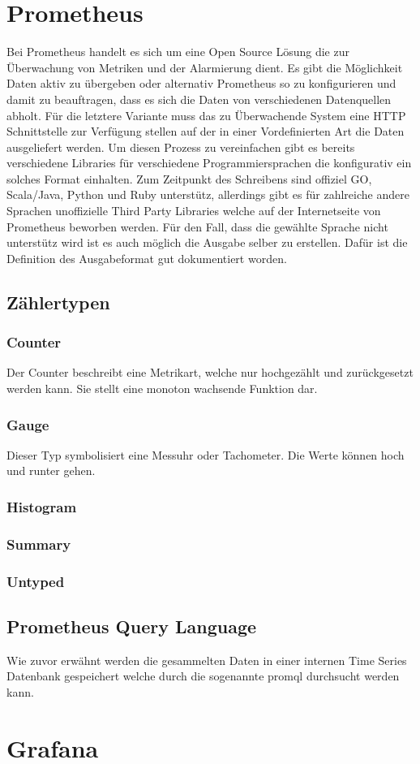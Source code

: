 \section{Prometheus}
Bei Prometheus handelt es sich um eine Open Source Lösung die zur Überwachung von Metriken und der Alarmierung dient. Es gibt die Möglichkeit Daten aktiv zu übergeben oder alternativ Prometheus so zu konfigurieren und damit zu beauftragen, dass es sich die Daten von verschiedenen Datenquellen abholt. Für die letztere Variante muss das zu Überwachende System eine HTTP Schnittstelle zur Verfügung stellen auf der in einer Vordefinierten Art die Daten ausgeliefert werden. Um diesen Prozess zu vereinfachen gibt es bereits verschiedene Libraries für verschiedene Programmiersprachen die konfigurativ ein solches Format einhalten. Zum Zeitpunkt des Schreibens sind offiziel GO, Scala/Java, Python und Ruby unterstütz, allerdings gibt es für zahlreiche andere Sprachen unoffizielle Third Party Libraries welche auf der Internetseite von Prometheus beworben werden. Für den Fall, dass die gewählte Sprache nicht unterstütz wird ist es auch möglich die Ausgabe selber zu erstellen. Dafür ist die Definition des Ausgabeformat gut dokumentiert worden. 
\subsection{Zählertypen}
\subsubsection{Counter}
Der Counter beschreibt eine Metrikart, welche nur hochgezählt und zurückgesetzt werden kann. Sie stellt eine monoton wachsende Funktion dar. 
\subsubsection{Gauge}
Dieser Typ symbolisiert eine Messuhr oder Tachometer. Die Werte können hoch und runter gehen. 

\subsubsection{Histogram}
\subsubsection{Summary}
\subsubsection{Untyped}

\subsection{Prometheus Query Language}
Wie zuvor erwähnt werden die gesammelten Daten in einer internen Time Series Datenbank gespeichert welche durch die sogenannte \gls{promql} durchsucht werden kann.

\section{Grafana}

